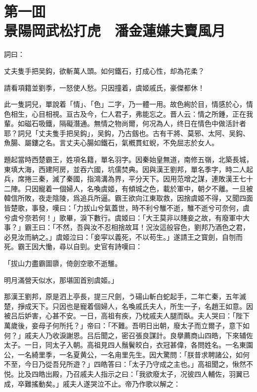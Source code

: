 
\chapter*{第一囬　\\景陽岡武松打虎　潘金蓮嫌夫賣風月}


詞曰：

\begin{myquote}
丈夫隻手把吴鈎，欲斬萬人頭。如何鐵石，打成心性，却為花柔？

請看項籍並劉季，一怒使人愁。只因撞着，虞姬戚氏，豪傑都休！
\end{myquote}

此一隻詞兒，單說着「情」、「色」二字，乃一體一用。故色絢於目，情感於心，情色相生，心目相視。亘古及今，仁人君子，弗能忘之。晋人云：情之所鍾，正在我輩。如磁石吸鐵，隔礙潛通。無情之物尚爾，何况為人，终日在情色中做活計者耶？詞兒「丈夫隻手把吴鈎」，吴鈎，乃古劔也。古有干將、莫邪、太阿、吴鈎、魚腸、屬鏤之名。言丈夫心腸如鐵石，氣槪貫虹蜺，不免屈志於女人。

題起當時西楚霸王，姓項名籍，單名羽字。因秦始皇無道，南修五嶺，北築長城，東填大海，西建阿房，並吞六國，坑儒焚典。因與漢王劉邦，單名季字，時二人起兵，席捲三秦，滅了秦國，指鴻溝為界，平分天下。因用范增之謀，連敗漢王七十二陣。只因寵着一個婦人，名喚虞姬，有傾城之色，載於軍中，朝夕不離。一旦被韓信所敗，夜走陰陵，爲追兵所逼。霸王欲向江東取救，因捨虞姬不得，又聞四面皆楚歌，事發，嘆曰：「力拔山兮氣蓋世，時不利兮騅不逝，騅不逝兮可奈何，虞兮虞兮奈若何！」歌畢，淚下數行。虞姬曰：「大王莫非以賤妾之故，有廢軍中大事？」霸王曰：「不然，吾與汝不忍相捨故耳！況汝這般容色，劉邦乃酒色之君，必見汝而納之。」虞姬泣曰：「妾寜以義死，不以苟生。」遂請王之寳劍，自刎而死。霸王因大慟，尋以自剄。史官有詩嘆曰：

\begin{myquote}
「拔山力盡霸圖隳，倚劍空歌不逝騅。

明月滿營天似水，那堪囬首别虞姬。」
\end{myquote}

那漢王劉邦，原是泗上亭長，提三尺劍，う碭山斬白蛇起手，二年亡秦，五年滅楚，掙成天下。只因也是寵着個婦人，名喚戚氏夫人，所生一子，名趙王如意。因被吕后妒害，心甚不安。一日，高祖有疾，乃枕戚夫人腿而臥。夫人哭曰：「陛下萬歲後，妾母子何所托？」帝曰：「不難。吾明日出朝，廢太子而立爾子，意下如何？」戚夫人乃收淚謝恩。吕后聞之，密召張良謀計。良擧薦商山四皓，下來辅佐太子。一日，同太子入朝。高祖見四人鬚鬢皎白，衣冠甚偉，各問姓名。一名東園公，一名綺里季，一名夏黄公，一名甪里先生。因大驚問：「朕昔求聘諸公，如何不至，今日乃從吾兒所遊？」四皓答曰：「太子乃守成之主也。」高祖聞之，愀然不悦。比及四皓出殿，乃召戚夫人指示之曰：「我欲廢太子，况彼四人輔佐，羽翼已成，卒難搖動矣。」戚夫人遂哭泣不止。帝乃作歌以解之：

